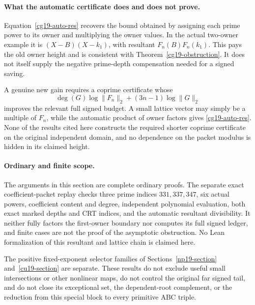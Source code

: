 \paragraph{What the automatic certificate does and does not prove.}
Equation~\eqref{cg19-auto-res} recovers the bound obtained by
assigning each prime power to its owner and multiplying the
owner values. In the actual two-owner example it is
\((X-B)(X-k_1)\), with resultant \(F_n(B)F_n(k_1)\). This pays
the old owner height and is consistent with
Theorem~\ref{cg19-obstruction}. It does not itself supply the
negative prime-depth compensation needed for a signed saving.

A genuine new gain requires a coprime certificate whose
\[
 \deg(G)\log\|F_n\|_2+(3n-1)\log\|G\|_2
\]
improves the relevant full signed budget. A small lattice
vector may simply be a multiple of \(F_n\), while the automatic
product of owner factors gives \eqref{cg19-auto-res}. None of
the results cited here constructs the required shorter coprime
certificate on the original independent domain, and no
dependence on the packet modulus is hidden in its claimed height.

\paragraph{Ordinary and finite scope.}
The arguments in this section are complete ordinary proofs.
The separate exact coefficient-packet replay checks three prime
indices \(331,337,347\), six actual powers, coefficient content
and degree, independent polynomial evaluation, both exact marked
depths and CRT indices, and the automatic resultant divisibility.
It neither fully factors the first-owner boundary nor computes
its full signed ledger, and finite cases are not the proof of
the asymptotic obstruction. No Lean formalization of this
resultant and lattice chain is claimed here.

The positive fixed-exponent selector families of
Sections~\ref{np19-section} and~\ref{cu19-section} are separate.
These results do not exclude useful small intersections or
other nonlinear maps, do not control the original far signed
tail, and do not close its exceptional set, the dependent-root
complement, or the reduction from this special block to every
primitive ABC triple.
